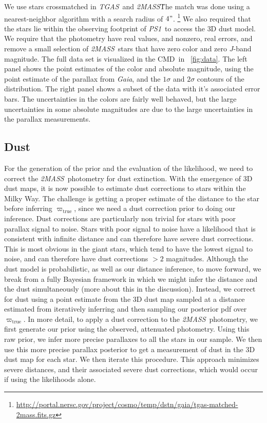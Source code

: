 \documentclass[modern]{aastex61}
\newcommand{\acronym}[1]{{\small{#1}}}
\newcommand{\project}[1]{\textsl{#1}}
\newcommand{\tgas}{\project{\acronym{TGAS}}}
\newcommand{\tmass}{\project{\acronym{2MASS}}}
\newcommand{\psone}{\project{\acronym{PS1}}}
\newcommand{\gaia}{\project{Gaia}}
\newcommand{\cmd}{\acronym{CMD}}
\newcommand{\true}{\mathrm{true}}
\begin{document}
We use stars crossmatched in \tgas\ and \tmass\.
The match was done using a nearest-neighbor algorithm with a search radius of $4"$.
\footnote{\url{http://portal.nersc.gov/project/cosmo/temp/dstn/gaia/tgas-matched-2mass.fits.gz}}
We also required that the stars lie within the
observing footprint of \psone\ to access the \cite{green15} 3D dust model.
We require that the photometry have real values, and nonzero, real errors, and
remove a small selection of \tmass\ stars that have zero color and zero $J$-band
magnitude.
The full data set is visualized in the \cmd\ in \figurename~\ref{fig:data}.
The left panel shows the point estimates of the color and absolute magnitude,
using the point estimate of the parallax from \gaia, and the $1\sigma$ and
$2\sigma$ contours of the distribution.
The right panel shows a subset of the data with it's associated error bars.
The uncertainties in the colors are fairly well behaved, but the large
uncertainties in some absolute magnitudes are due to the large uncertainties in
the parallax measurements.

\subsection{Dust}

For the generation of the prior and the evaluation of the likelihood, we need to
correct the \tmass\ photometry for dust extinction.
With the emergence of 3D dust maps, it is now possible to estimate dust
corrections to stars within the Milky Way. The challenge is getting a
proper estimate of the distance to the star before inferring
$\varpi_{\true}$, since we need a dust correction prior to doing our
inference. Dust corrections are particularly non trivial for stars
with poor parallax signal to noise. Stars with poor signal to noise
have a likelihood that is consistent with infinite distance and can
therefore have severe dust corrections. This is most obvious in the
giant stars, which tend to have the lowest signal to noise, and can
therefore have dust corrections $> 2$ magnitudes. Although the dust
model is probabilistic, as well as our distance inference, to move
forward, we break from a fully Bayesian framework in which we might
infer the distance and the dust simultaneously (more about this in the
discussion). Instead, we correct for dust using a point estimate from
the 3D dust map \citep{green15} sampled at a distance estimated from
iteratively inferring and then sampling our posterior pdf over
$\varpi_{\true}$. In more detail, to apply a dust correction to the
\tmass\ photometry, we first generate our prior using the observed,
attenuated photometry. Using this raw prior, we infer more precise
parallaxes to all the stars in our sample. We then use this more
precise parallax posterior to get a measurement of dust in the 3D dust
map for each star. We then iterate this procedure. This approach minimizes severe
distances, and their associated severe dust corrections, which would
occur if using the likelihoods alone.
\end{document}
